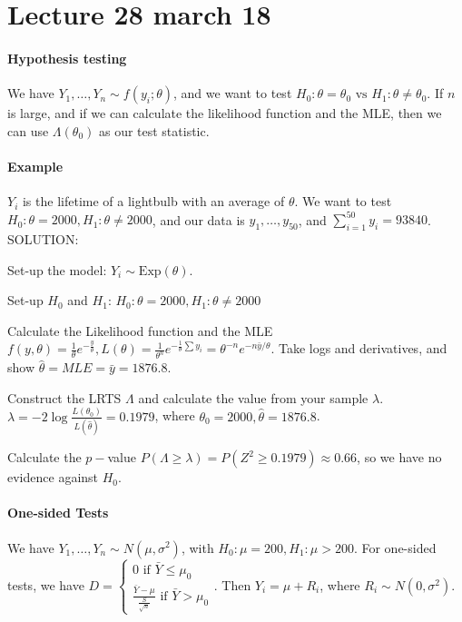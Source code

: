 \documentclass[10pt,letter]{article}
\theoremstyle{plain}
\theoremstyle{definition}
\begin{document}
\section*{Lecture 28 march 18}
\paragraph{Hypothesis testing}
We have $Y_1,\ldots,Y_n\sim f(y_i;\theta)$, and we want to test $H_0:\theta=\theta_0 \text{ vs }H_1:\theta\neq\theta_0$. If $n$ is large, and if we can calculate the likelihood function and the MLE, then we can use $\Lambda(\theta_0)$ as our test statistic. 
\paragraph{Example}
$Y_i$ is the lifetime of a lightbulb with an average of $\theta$. We want to test $H_0:\theta=2000,H_1:\theta\neq2000$, and our data is $y_1,\ldots,y_{50}$, and $\sum_{i=1}^{50}y_i=93840$. \\ 
SOLUTION: \begin{steps}
     \item Set-up the model: $Y_i\sim\text{Exp}(\theta)$. 
     \item Set-up $H_0$ and $H_1$: $H_0:\theta=2000,H_1:\theta\neq2000$
     \item Calculate the Likelihood function and the MLE $f(y,\theta)=\frac{1}{\theta}e^{-\frac{y}{\theta}}, L(\theta)=\frac{1}{\theta^n}e^{-\frac{1}{\theta}\sum y_i}=\theta^{-n}e^{-n\bar{y}/\theta}$. Take logs and derivatives, and show $\hat{\theta}=MLE=\bar{y}=1876.8$. 
     \item Construct the LRTS $\Lambda$ and calculate the value from your sample $\lambda$. $\lambda=-2\log\frac{L(\theta_0)}{L(\hat{\theta})}=0.1979$, where $\theta_0=2000,\hat\theta=1876.8$. 
     \item Calculate the $p-$value $P(\Lambda\geq\lambda)=P(Z^2\geq0.1979)\approx0.66$, so we have no evidence against $H_0$. 
\end{steps}
\paragraph{One-sided Tests}
We have $Y_1,\ldots,Y_n\sim N(\mu,\sigma^2)$, with $H_0:\mu=200,H_1:\mu>200$. For one-sided tests, we have $D=\begin{cases}0\text{ if  }\bar{Y}\leq\mu_0\\\frac{\bar{Y}-\mu}{\frac{S}{\sqrt{n}}}\text{ if }\bar{Y}>\mu_0\end{cases}$. Then $Y_i=\mu+R_i$, where $R_i\sim N(0,\sigma^2)$. 
\end{document}
